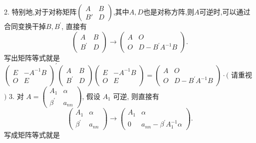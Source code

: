 \documentclass{article}
\begin{document}
2. 特别地,对于对称矩阵$\left(\begin{array}{cc}
            A  & B \\
            B' & D
        \end{array}\right)$,其中$A,D$也是对称方阵,则$A$可逆时,可以通过合同变换干掉$B, B^{\prime}$, 直接有
\begin{equation*}
    \left(\begin{array}{cc}
        A          & B \\
        B^{\prime} & D
    \end{array}\right) \longrightarrow\left(\begin{array}{cc}
        A & O                     \\
        O & D-B^{\prime} A^{-1} B
    \end{array}\right).
\end{equation*}
写出矩阵等式就是
$\left(\begin{array}{cc}E & -A^{-1} B \\ O & E\end{array}\right)^{\prime}\left(\begin{array}{cc}A & B \\ B^{\prime} & D\end{array}\right)\left(\begin{array}{cc}E & -A^{-1} B \\ O & E\end{array}\right)=\left(\begin{array}{cc}A & O \\ O & D-B^{\prime} A^{-1} B\end{array}\right) \cdot($ 请重视 $)$
3. 对 $A=\left(\begin{array}{cc}A_{1} & \alpha \\ \beta^{\prime} & a_{n n}\end{array}\right)$, 假设 $A_{1}$ 可逆, 则直接有
\begin{equation*}
    \left(\begin{array}{cc}
        A_{1}          & \alpha  \\
        \beta^{\prime} & a_{n n}
    \end{array}\right) \longrightarrow\left(\begin{array}{cc}
        A_{1} & \alpha                                   \\
        0     & a_{n n}-\beta^{\prime} A_{1}^{-1} \alpha
    \end{array}\right).
\end{equation*}
写成矩阵等式就是
\end{document}
